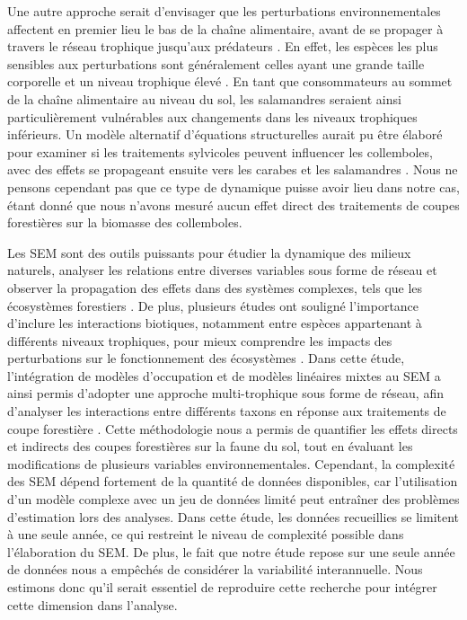 Une autre approche serait d'envisager que les perturbations environnementales affectent en premier lieu le bas de la chaîne alimentaire, avant de se propager à travers le réseau trophique jusqu'aux prédateurs \citep{Laigle2021Directindirect}. 
En effet, les espèces les plus sensibles aux perturbations sont généralement celles ayant une grande taille corporelle et un niveau trophique élevé \citep{Seibold2015Associationextinction,Nolte2019Habitatspecialization,Hagge2021Whatdoes}. 
En tant que consommateurs au sommet de la chaîne alimentaire au niveau du sol, les salamandres seraient ainsi particulièrement vulnérables aux changements dans les niveaux trophiques inférieurs. 
Un modèle alternatif d'équations structurelles aurait pu être élaboré pour examiner si les traitements sylvicoles peuvent influencer les collemboles, avec des effets se propageant ensuite vers les carabes et les salamandres \citep{Laigle2021Directindirect}. 
Nous ne pensons cependant pas que ce type de dynamique puisse avoir lieu dans notre cas, étant donné que nous n'avons mesuré aucun effet direct des traitements de coupes forestières sur la biomasse des collemboles. 

Les SEM sont des outils puissants pour étudier la dynamique des milieux naturels, analyser les relations entre diverses variables sous forme de réseau et observer la propagation des effets dans des systèmes complexes, 
tels que les écosystèmes forestiers \citep{graceSpecificationStructuralEquation2010}.  
De plus, plusieurs études ont souligné l’importance d’inclure les interactions biotiques, notamment entre espèces appartenant à différents niveaux trophiques, pour mieux comprendre les impacts des perturbations 
sur le fonctionnement des écosystèmes \citep{Thebault2003Foodwebconstraints,Seibold2018necessitymultitrophic,Laigle2021Directindirect}.  
Dans cette étude, l’intégration de modèles d’occupation et de modèles linéaires mixtes au SEM a ainsi permis d’adopter une approche multi-trophique sous forme de réseau, 
afin d’analyser les interactions entre différents taxons en réponse aux traitements de coupe forestière \citep{josephIntegratingOccupancyModels2016}.  
Cette méthodologie nous a permis de quantifier les effets directs et indirects des coupes forestières sur la faune du sol, tout en évaluant les modifications de plusieurs variables environnementales. 
Cependant, la complexité des SEM dépend fortement de la quantité de données disponibles, car l’utilisation d’un modèle complexe avec un jeu de données limité peut entraîner des problèmes d’estimation lors des analyses.  
Dans cette étude, les données recueillies se limitent à une seule année, ce qui restreint le niveau de complexité possible dans l'élaboration du SEM.
De plus, le fait que notre étude repose sur une seule année de données nous a empêchés de considérer la variabilité interannuelle.  
Nous estimons donc qu’il serait essentiel de reproduire cette recherche pour intégrer cette dimension dans l’analyse. 

